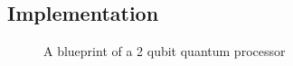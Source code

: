 \subsection{Implementation}

\begin{figure}
	\centering
	\label{fig:Grover2}
	\caption{}
\end{figure}

\begin{figure}
	\centering
	\label{fig:Grover3}
	\caption{}
\end{figure}



\begin{figure}
	\centering
	\label{fig:iSwap1}
	\caption{}
\end{figure}

\begin{figure}
	\centering
	\label{fig:iSwap2}
	\caption{A blueprint of a 2 qubit quantum processor}
\end{figure}

\begin{figure}
	\centering
	\label{fig:iSwap3}
	\caption{}
\end{figure}

\begin{figure}
	\centering
	\label{fig:iSwap4}
	\caption{}
\end{figure}
